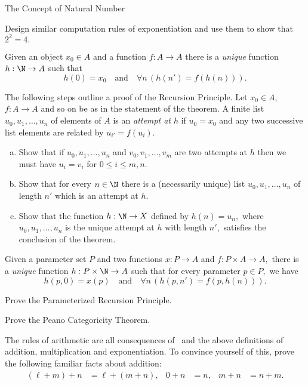 \begin{unit}{The Concept of Natural Number}
\begin{problem}
  Design similar computation rules of exponentiation and use them to show that \(2^2 = 4.\) 
\end{problem}

\begin{theorem}\label{T:Recursion}
  Given an object \(x_0 \in A\) and a function \(f:A \to A\) there is a \emph{unique} function \(h:\N \to A\) such that \[h(0) = x_0 \quad\text{and}\quad \forall n\,(h(n') = f(h(n))).\]
\end{theorem}

\begin{problem}
  The following steps outline a proof of the Recursion Principle.
  Let \(x_0 \in A,\) \(f:A \to A\) and so on be as in the statement of the theorem.
  A finite list \(u_0,u_1,\dots,u_n\) of elements of \(A\) is an \emph{attempt at \(h\)} if \(u_0 = x_0\) and any two successive list elements are related by \(u_{i'} = f(u_i).\)
  \begin{enumerate}[(a)]
  \item Show that if \(u_0,u_1,\dots,u_n\) and \(v_0,v_1,\dots,v_m\) are two attempts at \(h\) then we must have \(u_i = v_i\) for \(0 \leq i \leq m,n.\)
  \item Show that for every \(n \in \N\) there is a (necessarily unique) list \(u_0,u_1,\dots,u_n\) of length \(n'\) which is an attempt at \(h.\)
  \item Show that the function \(h:\N \to X\) defined by \(h(n) = u_n,\) where \(u_0,u_1,\dots,u_n\) is the unique attempt at \(h\) with length \(n',\) satisfies the conclusion of the theorem.
  \end{enumerate}
\end{problem}

\begin{theorem}\label{T:ParameterizedRecursion}
  Given a parameter set \(P\) and two functions \(x:P \to A\) and \(f:P \times A \to A,\) there is a \emph{unique} function \(h:P \times \N \to A\) such that for every parameter \(p \in P,\) we have \[h(p,0) = x(p) \quad\text{and}\quad \forall n\,(h(p,n') = f(p,h(n))).\] 
\end{theorem}

\begin{problem}
  Prove the Parameterized Recursion Principle.
\end{problem}

\begin{problem}
  Prove the Peano Categoricity Theorem.
\end{problem}

\begin{problem}
  The rules of arithmetic are all consequences of \PA\ and the above definitions of addition, multiplication and exponentiation.
  To convince yourself of this, prove the following familiar facts about addition:
  \[\begin{aligned}
    (\ell + m) + n &= \ell + (m+n), & 0 + n &= n, & m + n &= n + m.
  \end{aligned}\]
\end{problem}

\end{unit}
\endinput
